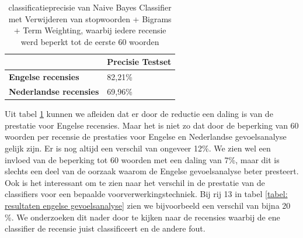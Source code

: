 \begin{table}[H]
\centering
\begin{tabular}{l|l|}
\cline{2-2}
                                                  & {\bf Precisie Testset} \\ \hline
\multicolumn{1}{|l|}{{\bf Engelse recensies}}     & 82,21\%                \\ \hline
\multicolumn{1}{|l|}{{\bf Nederlandse recensies}} & 69,96\%                \\ \hline
\end{tabular}
\caption{classificatieprecisie van Naive Bayes Classifier met Verwijderen van stopwoorden + Bigrams + Term Weighting, waarbij iedere recensie werd beperkt tot de eerste 60 woorden}
\label{tabel: beperking tot 60 woorden}
\end{table}

Uit tabel \ref{tabel: beperking tot 60 woorden} kunnen we afleiden dat er door de reductie een daling is van de prestatie voor Engelse recensies. Maar het is niet zo dat door de beperking van 60 woorden per recensie de prestaties voor Engelse en Nederlandse gevoelsanalyse gelijk zijn. Er is nog altijd een verschil van ongeveer 12\%. We zien wel een invloed van de beperking tot 60 woorden met een daling van 7\%, maar dit is slechts een deel van de oorzaak waarom de Engelse gevoelsanalyse beter presteert.\\

Ook is het interessant om te zien naar het verschil in de prestatie van de classifiers voor een bepaalde voorverwerkingstechniek. Bij rij 13 in tabel \ref{tabel: resultaten engelse gevoelsanalyse} zien we bijvoorbeeld een verschil van bijna 20 \%. We onderzoeken dit nader door te kijken naar de recensies waarbij de ene classifier de recensie juist classificeert en de andere fout.

